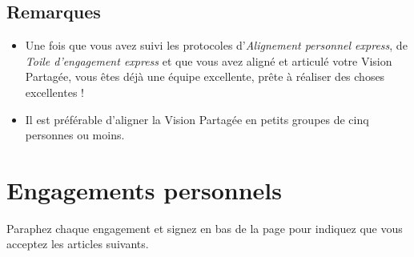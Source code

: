 \documentclass[paper=6in:9in,pagesize=pdftex,headinclude=on,footinclude=on,11pt]{scrbook}
\let\oldsection\section
\renewcommand\section{\clearpage\oldsection}
\begin{document}
\subsection{Remarques}
\begin{itemize}
	\item Une fois que vous avez suivi les protocoles d'\emph{Alignement personnel express}, de \emph{Toile d'engagement express} et que vous avez aligné et articulé
	      votre Vision Partagée, vous êtes déjà une équipe excellente, prête à réaliser des choses excellentes !
	\item Il est préférable d'aligner la Vision Partagée en petits groupes de cinq personnes ou moins.
\end{itemize}

\section{Engagements personnels} \label{engagements-personnels}

Paraphez chaque engagement et signez en bas de la page pour indiquez que vous acceptez les articles suivants.
\end{document}
